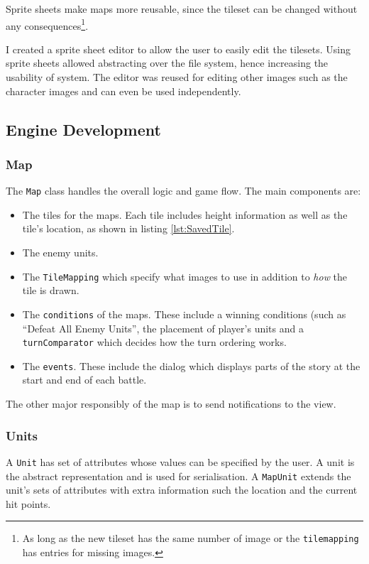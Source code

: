 Sprite sheets make maps more reusable, since the tileset can be changed without any consequences\footnote{As long as the new tileset has the same number of image or the \texttt{tilemapping} has entries for missing images.}.  

I created a sprite sheet editor to allow the user to easily edit the tilesets. Using sprite sheets allowed abstracting over the file system, hence increasing the usability of system. The editor was reused for editing other images such as the character images and can even be used independently.

\clearpage
\subsection{Engine Development}
\label{sub:engine_development_and_testing}
\subsubsection{Map}
\label{ssub:maps}


The \texttt{Map} class handles the overall logic and game flow.   The main components are:
\begin{itemize}
\item The tiles for the maps. Each tile includes height information as well as the tile's location, as shown in listing \ref{lst:SavedTile}.

\item The enemy units.     

\item The \texttt{TileMapping} which specify what images to use in addition to \emph{how} the tile is drawn. 

\item  The \texttt{conditions} of the maps. These include a winning conditions (such as ``Defeat All Enemy Units'',  the placement of player's units and a \texttt{turnComparator} which decides how the turn ordering works.  

\item  The \texttt{events}. These include the dialog which displays parts of the story at the start and end of each battle. 
\end{itemize}

The other major responsibly of the map is to send notifications to the view.  

\subsubsection{Units}
\label{ssub:units}
A \texttt{Unit} has set of attributes whose values can be specified by the user. A unit is the abstract representation and is used for serialisation.  A \texttt{MapUnit} extends the unit's sets of attributes with extra information such the location and the current hit points.

